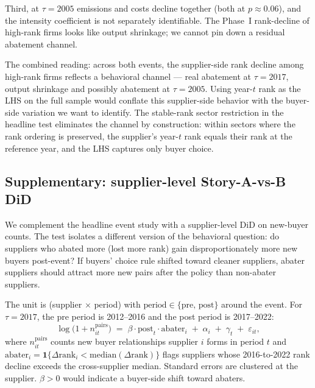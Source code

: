 Third, at $\tau = 2005$ emissions and costs decline together (both at $p \approx 0.06$), and the intensity coefficient is not separately identifiable. The Phase~I rank-decline of high-rank firms looks like output shrinkage; we cannot pin down a residual abatement channel.

The combined reading: across both events, the supplier-side rank decline among high-rank firms reflects a behavioral channel --- real abatement at $\tau = 2017$, output shrinkage and possibly abatement at $\tau = 2005$. Using year-$t$ rank as the LHS on the full sample would conflate this supplier-side behavior with the buyer-side variation we want to identify. The stable-rank sector restriction in the headline test eliminates the channel by construction: within sectors where the rank ordering is preserved, the supplier's year-$t$ rank equals their rank at the reference year, and the LHS captures only buyer choice.

\subsection{Supplementary: supplier-level Story-A-vs-B DiD}\label{app:omega_rank_supplier_did}

We complement the headline event study with a supplier-level DiD on new-buyer counts. The test isolates a different version of the behavioral question: do suppliers who abated more (lost more rank) gain disproportionately more new buyers post-event? If buyers' choice rule shifted toward cleaner suppliers, abater suppliers should attract more new pairs after the policy than non-abater suppliers.

The unit is (supplier $\times$ period) with $\text{period} \in \{\text{pre, post}\}$ around the event. For $\tau = 2017$, the pre period is 2012--2016 and the post period is 2017--2022:
\begin{equation}
    \log\big(1 + n^{\text{pairs}}_{it}\big) \;=\; \beta \cdot \text{post}_t \cdot \text{abater}_i \;+\; \alpha_i \;+\; \gamma_t \;+\; \varepsilon_{it},
    \label{eq:omega_rank_supplier_did}
\end{equation}
where $n^{\text{pairs}}_{it}$ counts new buyer relationships supplier $i$ forms in period $t$ and $\text{abater}_i = \mathbf{1}\{\Delta \text{rank}_i < \text{median}(\Delta \text{rank})\}$ flags suppliers whose 2016-to-2022 rank decline exceeds the cross-supplier median. Standard errors are clustered at the supplier. $\beta > 0$ would indicate a buyer-side shift toward abaters.

